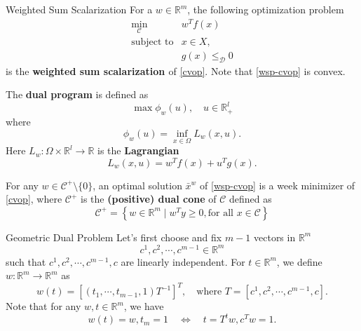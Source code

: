 \documentclass[10pt,xcolor={table,dvipsnames},t,unknownkeysallowed]{beamer}
\newcommand{\R}{\mathbb{R}}
\newcommand{\cone}[1]{\mathcal{#1}}
\begin{document}
\begin{frame}{Weighted Sum Scalarization}
    For a $w\in \R^m$, the following optimization problem
     \begin{equation}\label{wsp-cvop} \tag{ws-VOP$_w$-P}
      \begin{array}{ll}
        \min_{\cone{C}}& w^Tf(x)\\
        \text{subject to}& x\in X, \;\; \\
        & g(x)\leq_{\cone{D}} 0
    	   \end{array}
    \end{equation}
    is the \textbf{\alert{weighted sum scalarization }} of \eqref{cvop}. Note that \eqref{wsp-cvop} is convex. 
\end{frame}
\begin{frame}{}
    The \textbf{\alert{dual program}} is defined as
    \begin{equation}\label{wsd-cvop}\tag{ws-VOP$_w$-D}
        \max \phi_w(u), \quad u\in \R^l_+
    \end{equation}
    where 
    \[
    \phi_w(u) = \inf_{x\in \Omega} L_w(x,u).
    \] 
    Here $L_w:\Omega\times\R^l \to \R$ is the \textbf{\alert{Lagrangian}}
    \[
    L_w(x,u) = w^Tf(x)+u^Tg(x).
    \]
    
    \begin{proposition}
    For any $w\in\cone{C}^+\setminus\{0\}$, an optimal solution $\bar{x}^w$ of \eqref{wsp-cvop} is a week minimizer of \eqref{cvop}, where $\cone{C}^+$ is the \textbf{\alert{(positive) dual cone}} of $\cone{C}$ defined as 
    \[    
        \cone{C}^+ = \left\{w \in \R^m\; | \;  w^Ty \geq 0, \text{for all } x\in \cone{C}\right\}
    \]
    \end{proposition}
    
\end{frame}

\begin{frame}{Geometric Dual Problem}
    Let's first choose and fix $m-1$ vectors in $\R^m$
    \[
    c^1,c^2,\cdots,c^{m-1} \in \R^m
    \]
    such that $c^1,c^2,\cdots,c^{m-1}, c$ are linearly independent. For $t\in\R^m$, we define $w:\R^m\to\R^m$ as
    \[
     w(t) = [(t_1,\cdots,t_{m-1},1)T^{-1}]^T, \quad \text{where } T = [c^1,c^2,\cdots,c^{m-1}, c].
    \]
    Note that for any $w,t\in \R^m$, we have
    \begin{equation}\label{useful-statement}
        w(t) = w, t_m=1 \quad \Longleftrightarrow  \quad  t=T^tw, c^Tw=1.
    \end{equation}
\end{frame}
\end{document}
